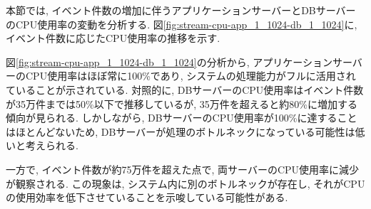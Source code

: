 \documentclass[../../../../../../main]{subfiles}
\begin{document}
    \label{subsubsubsec:result-streaming-only-limit-cpu}

    本節では, イベント件数の増加に伴うアプリケーションサーバーとDBサーバーのCPU使用率の変動を分析する. 図\ref{fig:stream-cpu-app_1_1024-db_1_1024}に, イベント件数に応じたCPU使用率の推移を示す.

    

    図\ref{fig:stream-cpu-app_1_1024-db_1_1024}の分析から, アプリケーションサーバーのCPU使用率はほぼ常に100\%であり, システムの処理能力がフルに活用されていることが示されている. 対照的に, DBサーバーのCPU使用率はイベント件数が35万件までは50\%以下で推移しているが, 35万件を超えると約80\%に増加する傾向が見られる. しかしながら, DBサーバーのCPU使用率が100\%に達することはほとんどないため, DBサーバーが処理のボトルネックになっている可能性は低いと考えられる.

    一方で, イベント件数が約75万件を超えた点で, 両サーバーのCPU使用率に減少が観察される. この現象は, システム内に別のボトルネックが存在し, それがCPUの使用効率を低下させていることを示唆している可能性がある.
\end{document}
